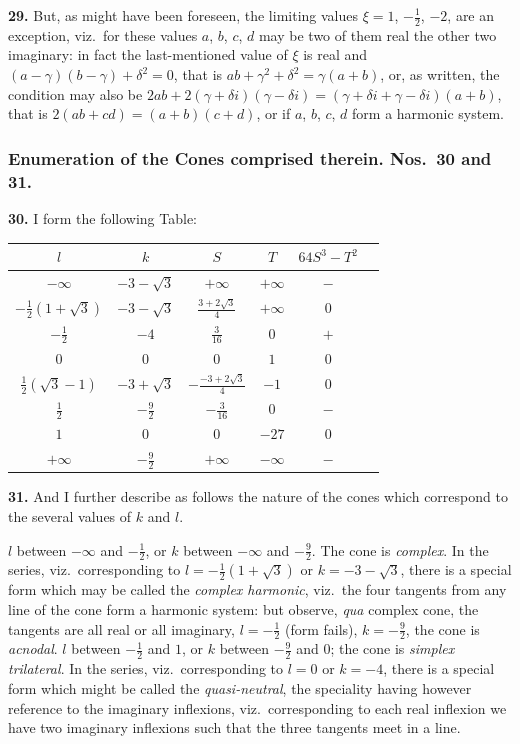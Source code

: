 \documentclass[11pt,a4paper]{article}
\theoremstyle{plain}
\begin{document}
\noindent\textbf{29.} But, as might have been foreseen, the limiting values $\xi = 1$, $-\tfrac{1}{2}$, $-2$, are an exception, viz.\ for these values $a$, $b$, $c$, $d$ may be two of them real the other two imaginary: in fact the last-mentioned value of $\xi$ is real and $(a-\gamma)(b-\gamma)+\delta^2 = 0$, that is $ab + \gamma^2 + \delta^2 = \gamma(a+b)$, or, as written, the condition may also be $2ab + 2(\gamma+\delta i)(\gamma-\delta i) = (\gamma+\delta i + \gamma-\delta i)(a+b)$, that is $2(ab+cd) = (a+b)(c+d)$, or if $a$, $b$, $c$, $d$ form a harmonic system.

\subsubsection*{Enumeration of the Cones comprised therein. Nos.\ 30 and 31.}

\noindent\textbf{30.} I form the following Table:
\begin{center}
\begin{tabular}{cccccc}
\toprule
$l$ & $k$ & $S$ & $T$ & $64S^3-T^2$ & \\
\midrule
$-\infty$ & $-3-\sqrt{3}$ & $+\infty$ & $+\infty$ & $-$ & \\
$-\tfrac{1}{2}(1+\sqrt{3})$ & $-3-\sqrt{3}$ & $\tfrac{3+2\sqrt{3}}{4}$ & $+\infty$ & $0$ & \\
$-\tfrac{1}{2}$ & $-4$ & $\tfrac{3}{16}$ & $0$ & $+$ & \\
$0$ & $0$ & $0$ & $1$ & $0$ & \\
$\tfrac{1}{2}(\sqrt{3}-1)$ & $-3+\sqrt{3}$ & $-\tfrac{-3+2\sqrt{3}}{4}$ & $-1$ & $0$ & \\
$\tfrac{1}{2}$ & $-\tfrac{9}{2}$ & $-\tfrac{3}{16}$ & $0$ & $-$ & \\
$1$ & $0$ & $0$ & $-27$ & $0$ & \\
$+\infty$ & $-\tfrac{9}{2}$ & $+\infty$ & $-\infty$ & $-$ & \\
\bottomrule
\end{tabular}
\end{center}

\noindent\textbf{31.} And I further describe as follows the nature of the cones which correspond to the several values of $k$ and $l$.

$l$ between $-\infty$ and $-\tfrac{1}{2}$, or $k$ between $-\infty$ and $-\tfrac{9}{2}$. The cone is \textit{complex}. In the series, viz.\ corresponding to $l = -\tfrac{1}{2}(1+\sqrt{3})$ or $k = -3-\sqrt{3}$, there is a special form which may be called the \textit{complex harmonic}, viz.\ the four tangents from any line of the cone form a harmonic system: but observe, \textit{qua} complex cone, the tangents are all real or all imaginary, $l = -\tfrac{1}{2}$ (form fails), $k = -\tfrac{9}{2}$, the cone is \textit{acnodal}. $l$ between $-\tfrac{1}{2}$ and $1$, or $k$ between $-\tfrac{9}{2}$ and $0$; the cone is \textit{simplex trilateral}. In the series, viz.\ corresponding to $l=0$ or $k=-4$, there is a special form which might be called the \textit{quasi-neutral}, the speciality having however reference to the imaginary inflexions, viz.\ corresponding to each real inflexion we have two imaginary inflexions such that the three tangents meet in a line.
\end{document}
